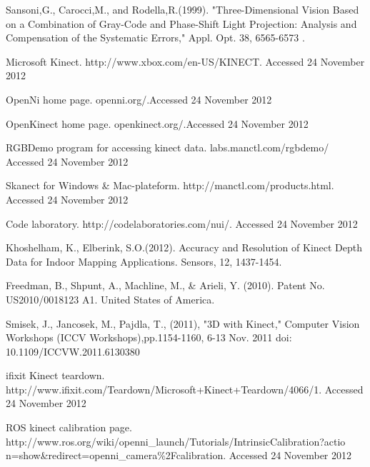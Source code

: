 \begin{singlespace}
\begin{thebibliography}{10000000000}
Sansoni,G., Carocci,M., and Rodella,R.(1999). "Three-Dimensional Vision Based on a Combination of Gray-Code and Phase-Shift Light Projection: Analysis and Compensation of the Systematic Errors," Appl. Opt.  38, 6565-6573 .

Microsoft Kinect.\newline
http://www.xbox.com/en-US/KINECT.\newline
Accessed 24 November 2012

OpenNi home page.\newline
openni.org/.Accessed 24 November 2012

OpenKinect home page.\newline
openkinect.org/.Accessed 24 November 2012

RGBDemo program for accessing kinect data.\newline
labs.manctl.com/rgbdemo/ \newline
Accessed 24 November 2012

Skanect for Windows \& Mac-plateform.\newline
http://manctl.com/products.html.\newline
Accessed 24 November 2012

Code laboratory.\newline
http://codelaboratories.com/nui/.\newline 
Accessed 24 November 2012

Khoshelham, K., Elberink, S.O.(2012). Accuracy and Resolution of Kinect Depth Data for Indoor Mapping Applications. Sensors, 12, 1437-1454.

Freedman, B., Shpunt, A., Machline, M., \& Arieli, Y. (2010).
Patent No. US2010/0018123 A1. United States of America.

Smisek, J., Jancosek, M., Pajdla, T., (2011), "3D with Kinect," Computer Vision Workshops (ICCV Workshops),pp.1154-1160, 6-13 Nov. 2011
doi: 10.1109/ICCVW.2011.6130380

ifixit Kinect teardown.\newline
http://www.ifixit.com/Teardown/Microsoft+Kinect+Teardown/4066/1.\newline
Accessed 24 November 2012

ROS kinect calibration page. \newline
http://www.ros.org/wiki/openni\_launch/Tutorials/IntrinsicCalibration?actio\newline
n=show\&redirect=openni\_camera\%2Fcalibration.\newline
Accessed 24 November 2012


\end{thebibliography}
\end{singlespace}
